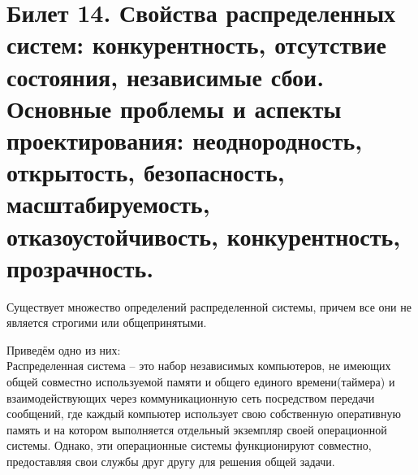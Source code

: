 \newpage
\section{Билет 14. Свойства распределенных систем: конкурентность, отсутствие состояния, независимые сбои. Основные проблемы и аспекты проектирования: неоднородность, открытость, безопасность, масштабируемость, отказоустойчивость, конкурентность, прозрачность.}

Существует множество определений распределенной системы, причем все они не является строгими или общепринятыми.

Приведём одно из них:\\
Распределенная  система – это набор  независимых  компьютеров,  не имеющих общей совместно используемой памяти и общего единого времени(таймера) и взаимодействующих через коммуникационную сеть  посредством  передачи  сообщений,  где  каждый  компьютер использует  свою  собственную  оперативную  память  и  на  котором выполняется  отдельный  экземпляр  своей  операционной  системы. Однако,  эти  операционные  системы  функционируют  совместно, предоставляя свои службы друг другу для решения общей задачи.\\

